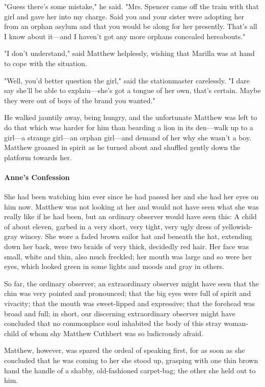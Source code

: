 \documentclass{article}
\begin{document}
"Guess there's some mistake," he said. "Mrs. Spencer came off the train with that girl and gave her into my charge. Said you and your sister were adopting her from an orphan asylum and that you would be along for her presently. That's all I know about it---and I haven't got any more orphans concealed hereabouts."

"I don't understand," said Matthew helplessly, wishing that Marilla was at hand to cope with the situation.

"Well, you'd better question the girl," said the stationmaster carelessly. "I dare say she'll be able to explain---she's got a tongue of her own, that's certain. Maybe they were out of boys of the brand you wanted."

He walked jauntily away, being hungry, and the unfortunate Matthew was left to do that which was harder for him than bearding a lion in its den---walk up to a girl---a strange girl---an orphan girl---and demand of her why she wasn't a boy. Matthew groaned in spirit as he turned about and shuffled gently down the platform towards her.
 
\paragraph{Anne's Confession}
She had been watching him ever since he had passed her and she had her eyes on him now. Matthew was not looking at her and would not have seen what she was really like if he had been, but an ordinary observer would have seen this: A child of about eleven, garbed in a very short, very tight, very ugly dress of yellowish-gray wincey. She wore a faded brown sailor hat and beneath the hat, extending down her back, were two braids of very thick, decidedly red hair. Her face was small, white and thin, also much freckled; her mouth was large and so were her eyes, which looked green in some lights and moods and gray in others.

So far, the ordinary observer; an extraordinary observer might have seen that the chin was very pointed and pronounced; that the big eyes were full of spirit and vivacity; that the mouth was sweet-lipped and expressive; that the forehead was broad and full; in short, our discerning extraordinary observer might have concluded that no commonplace soul inhabited the body of this stray woman-child of whom shy Matthew Cuthbert was so ludicrously afraid.

Matthew, however, was spared the ordeal of speaking first, for as soon as she concluded that he was coming to her she stood up, grasping with one thin brown hand the handle of a shabby, old-fashioned carpet-bag; the other she held out to him.
\end{document}
